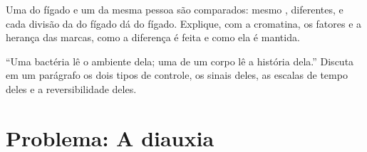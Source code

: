 \begin{exercise}[$\star\star\star$]\label{exo:b1:expression-control:11}
Uma  do fígado e um  da mesma pessoa são comparados: mesmo
,  diferentes, e cada divisão da  do fígado dá
 do fígado. Explique, com a cromatina, os fatores e a herança das
marcas, como a diferença é feita e como ela é mantida.
\end{exercise}

\begin{exercise}[$\star\star\star$]\label{exo:b1:expression-control:12}
``Uma bactéria lê o ambiente dela; uma  de um corpo lê a história
dela.'' Discuta em um parágrafo os dois tipos de controle, os sinais
deles, as escalas de tempo deles e a reversibilidade deles.
\end{exercise}

\section{Problema: A diauxia}

